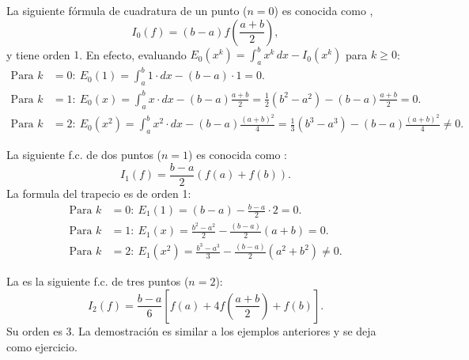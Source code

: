 \begin{example}
  \label{ex:formula-punto-medio}
  La siguiente fórmula de cuadratura de un punto ($n=0$) es conocida
  como ,
  \begin{equation}
    \label{eq:f.c.-pto-medio}
    I_0(f)= (b-a) f\left(\frac{a+b}{2}\right),
  \end{equation}
  y tiene orden $1$. En efecto, evaluando $E_0(x^k)=\int_a^b
  x^k\, dx-I_0(x^k)$ para $k\ge 0$:
  \begin{align*}
   \text{Para } k&=0:\ E_0(1) = \int_a^b 1\cdot dx - (b-a)\cdot 1 = 0.
   \\
   \text{Para } k&=1:\ E_0(x) = \int_a^b x\cdot dx - (b-a)\frac{a+b}{2}
   = \frac{1}{2}(b^2-a^2) -  (b-a) \frac{a+b}{2} = 0.
   \\
   \text{Para } k&=2:\ E_0(x^2) = \int_a^b x^2\cdot dx
   - (b-a) \frac{(a+b)^2}{4}
   = \frac{1}{3}(b^3-a^3) - (b-a)\frac{(a+b)^2}{4}
   \neq 0.
  \end{align*}
\end{example}

\begin{example}
  \label{ex:formula-trapecio}
  La siguiente f.c. de dos puntos ($n=1$) es conocida
  como :
  \begin{equation*}
    I_1(f)= \frac{b-a}{2}\left(f(a)+f(b)\right).
  \end{equation*}
  La formula del trapecio es de orden 1:
  \begin{align*}
    \text{Para } k&=0:\ E_1(1) = (b-a) - \frac{b-a}2\cdot 2 = 0.
    \\
    \text{Para } k&=1:\ E_1(x) = \frac{b^2-a^2}{2} -
    \frac{(b-a)}{2}(a+b) = 0.
    \\
    \text{Para } k&=2:\ E_1(x^2) = \frac{b^3-a^3}{3} -
    \frac{(b-a)}{2}(a^2+b^2) \neq 0.
  \end{align*}
\end{example}

\begin{example}
  \label{ex:formula-simpson}
  La  es la siguiente f.c.
  de tres puntos ($n=2$):
  \begin{equation}
    I_2(f)= \frac{b-a}{6}\left[f(a)+4f
      \left(\frac{a+b}{2}\right)+f(b)\right].
    \label{eq:formula-simpson}
  \end{equation}
  Su orden es $3$. La demostración es similar a los ejemplos anteriores y se deja como ejercicio.
\end{example}

